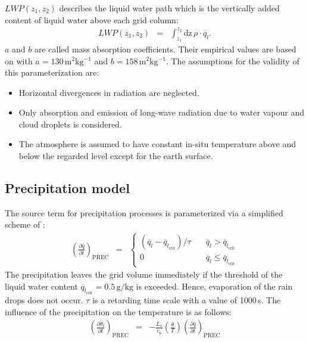 \documentclass[11pt,a4paper]{scrartcl}
\begin{document}
$LWP(z_{1},z_{2})$ describes the liquid water path which is the vertically added content of liquid water above each grid column: 
\begin{eqnarray}
 LWP(z_{1},z_{2}) & = & \int_{z_{1}}^{z_{2}}\mathrm{dz}\,\rho\cdot\overline q_{l}.
 \label{eq:LWP}
\end{eqnarray}
$a$ and $b$ are called mass absorption coefficients. Their empirical values are based on \linebreak
\cite{stephans78} with $a=130\,\mathrm{m^{2}kg^{-1}}$ and $b=158\,\mathrm{m^{2}kg^{-1}}$.
\newline
The assumptions for the validity of this parameterization are:
\begin{itemize}
 \item Horizontal divergences in radiation are neglected.
 \item Only absorption and emission of long-wave radiation due to water vapour and cloud droplets is considered.
 \item The atmosphere is assumed to have constant in-situ temperature above and below the regarded level except for the earth surface.
\end{itemize}

\subsection{Precipitation model}
The source term for precipitation processes is parameterized via a simplified scheme of \cite{kessler69}:
\begin{eqnarray}
 \left(\frac{\partial \overline q}{\partial t}\right)_{\mathrm{PREC}} & = &
  \begin{cases}
   \left(\overline q_{l}-\overline q_{l_{\mathrm{crit}}}\right)/ \tau & 
   \quad\overline q_{l} > \overline q_{l_{\mathrm{crit}}} \\
   0  & \quad\overline q_{l} \leq \overline q_{l_{\mathrm{crit}}}
  \end{cases}
 \label{precip_term_q}
\end{eqnarray}
The precipitation leaves the grid volume immediately if the threshold of the liquid water content 
$\overline q_{l_{\mathrm{crit}}}=0.5\,\mathrm{g/kg}$ is exceeded. Hence, evaporation of the rain drops does not occur.
$\tau$ is a retarding time scale with a value of 1000\,s.
\newline
The influence of the precipitation on the temperature is as follows:
\begin{eqnarray}
 \left(\frac{\partial \overline\theta_{l}}{\partial t}\right)_{\mathrm{PREC}} & = &
  -\frac{L_{v}}{c_{p}}\left(\frac{\theta}{T}\right)\left(\frac{\partial \overline q}{\partial t}\right)_{\mathrm{PREC}}
 \label{precip_term_pt}
\end{eqnarray}
\end{document}
